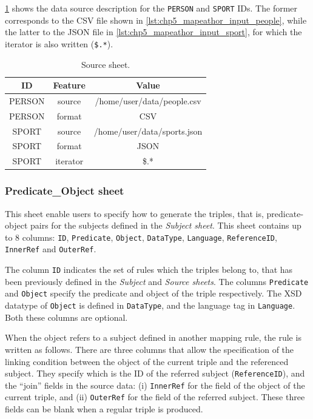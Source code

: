 \cref{tab:source_sheet} shows the data source description for the \texttt{PERSON} and \texttt{SPORT} IDs. The former corresponds to the CSV file shown in \cref{lst:chp5_mapeathor_input_people}, while the latter to the JSON file in \cref{lst:chp5_mapeathor_input_sport}, for which the iterator is also written (\texttt{\$.*}). 

\begin{table}[h!]
\caption{Source sheet.}
\label{tab:source_sheet}
\centering
\begin{tabular}{c|c|c}
\midrule
\textbf{ID} & \textbf{Feature} & \textbf{Value}              \\ \midrule
PERSON    & source          & /home/user/data/people.csv  \\
PERSON    & format          & CSV                         \\
SPORT     & source          & /home/user/data/sports.json \\
SPORT     & format          & JSON                        \\  
SPORT     & iterator        & \$.*                    \\ \midrule
\end{tabular}
\end{table}

\subsubsection{Predicate\_Object sheet} 
This sheet enable users to specify how to generate the triples, that is, predicate-object pairs for the subjects defined in the \textit{Subject sheet}. This sheet contains up to 8 columns: \texttt{ID}, \texttt{Predicate}, \texttt{Object}, \texttt{DataType}, \texttt{Language}, \texttt{ReferenceID}, \texttt{InnerRef} and \texttt{OuterRef}.

The column \texttt{ID} indicates the set of rules which the triples belong to, that has been previously defined in the \textit{Subject} and \textit{Source sheets}.
The columns \texttt{Predicate} and \texttt{Object} specify the predicate and object of the triple respectively. 
The XSD datatype of \texttt{Object} is defined in \texttt{DataType}, and the language tag in \texttt{Language}. Both these columns are optional. 

When the object refers to a subject defined in another mapping rule, the rule is written as follows. 
There are three columns that allow the specification of the linking condition between the object of the current triple and the referenced subject. 
They specify which is the ID of the referred subject  (\texttt{ReferenceID}), and the ``join'' fields in the source data: (i) \texttt{InnerRef} for the field of the object of the current triple, and (ii) \texttt{OuterRef} for the field of the referred subject. These three fields can be blank when a regular triple is produced. 

